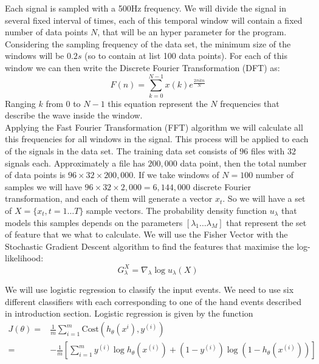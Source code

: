 \documentclass[final,leqno,onefignum,onetabnum]{siamltexmm}
\begin{document}
Each signal is sampled with a 500Hz frequency. We will divide the signal in several fixed interval of times, each of this temporal window will contain a fixed number of data points $N$, that will be an hyper parameter for the program. Considering the sampling frequency of the data set, the minimum size of the windows will be $0.2 s$ (so to contain at list 100 data points). 
For each of this window we can then write the Discrete Fourier Transformation (DFT) as:
\begin {equation}\label{DFT}
F(n) =\sum_{k=0}^{N-1}x(k)e^{\frac{2\pi i kn}{N}}
\end{equation}  
Ranging $k$ from $0$ to $N-1$ this equation represent the $N$ frequencies that describe the wave inside the window.\\
Applying the Fast Fourier Transformation (FFT) algorithm\cite{FFT} we will calculate all this frequencies for all windows in the signal. This process will be applied to each of the signals in the data set. The training data set consists of $96$ files with $32$ signals each. Approximately a file has $200,000$ data point, then the total number of data points is $96\times 32 \times 200,000$. If we take windows of $N=100$ number of samples we will have $96\times 32 \times 2,000=6,144,000$ discrete Fourier transformation, and each of them will generate a vector $x_t$. So we will have a set of $X=\{x_t,t=1\dots T\}$ sample vectors. The probability density function  $u_\lambda$  that models this samples
depends on the parameters $[\lambda_1\dots \lambda_M]$ that represent the set of feature that we what to calculate. We will use the Fisher Vector\cite{fisher} with the Stochastic Gradient Descent algorithm to find the features that maximise the log-likelihood:
\begin{equation}\label{loglikelihood}
G_\lambda^X= \nabla_\lambda \log u_\lambda(X)
\end{equation}


We will use logistic regression to classify the input events.  We need to use six different classifiers with each corresponding to one of the hand events described in introduction section.  Logistic regression is given by the function
\begin{align*}
  J(\theta) = & \frac{1}{m} \sum_{i = 1}^{m} \mathrm{Cost}(h_{\theta}(x^{i}), y^{(i)}) \\
  = & -\frac{1}{m} [\sum_{i=1}^{m} y^{(i)} \log{h_{\theta}(x^{(i)} )} + (1 - y^{(i)}) \log{( 1 - h_{\theta}(x^{(i)}) )}]
\end{align*}
\end{document}
